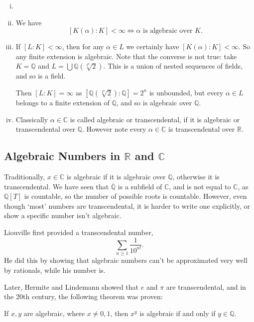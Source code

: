 \documentclass[12pt]{article}
\begin{document}
\begin{remark}
	\begin{enumerate}[(i)]
		\item[]
		\item We have
			\[
				[K(\alpha):K] < \infty \iff \alpha \text{ is algebraic over } K.
			\]
		\item If $[L:K] < \infty$, then for any $\alpha \in L$ we certainly have $[K(\alpha) : K] < \infty$. So any finite extension is algebraic. Note that the converse is not true: take $K = \mathbb{Q}$ and $L = \bigcup \mathbb{Q}(\!\sqrt[2^n]{2})$. This is a union of nested sequences of fields, and so is a field.

			Then $[L:K] = \infty$ as $[\mathbb{Q}(\!\sqrt[2^n]{2}): \mathbb{Q}] = 2^{n}$ is unbounded, but every $\alpha \in L$ belongs to a finite extension of $\mathbb{Q}$, and so is algebraic over $\mathbb{Q}$.
		\item Classically $\alpha \in \mathbb{C}$ is called algebraic or transcendental, if it is algebraic or transcendental over $\mathbb{Q}$. However note every $\alpha \in \mathbb{C}$ is transcendental over $\mathbb{R}$.
	\end{enumerate}
\end{remark}


\subsection{Algebraic Numbers in \texorpdfstring{$\mathbb{R}$}{R} and \texorpdfstring{$\mathbb{C}$}{C}}%
\label{sub:algebraic_numbers_in_R_and_C}

Traditionally, $x \in \mathbb{C}$ is algebraic if it is algebraic over $\mathbb{Q}$, otherwise it is transcendental. We have seen that $\overline{\mathbb{Q}}$ is a subfield of $\mathbb{C}$, and is not equal to $\mathbb{C}$, as $\mathbb{Q}[T]$ is countable, so the number of possible roots is countable. However, even though `most' numbers are transcendental, it is harder to write one explicitly, or show a specific number isn't algebraic.

Liouville first provided a transcendental number,
\[
\sum_{n \geq 1} \frac{1}{10^{n!}}
.\]
He did this by showing that algebraic numbers can't be approximated very well by rationals, while his number is.

Later, Hermite and Lindemann showed that $e$ and $\pi$ are transcendental, and in the 20th century, the following theorem was proven:

\begin{theorem}
	If $x, y$ are algebraic, where $x \neq 0, 1$, then $x^{y}$ is algebraic if and only if $y \in \mathbb{Q}$.
\end{theorem}
\end{document}
